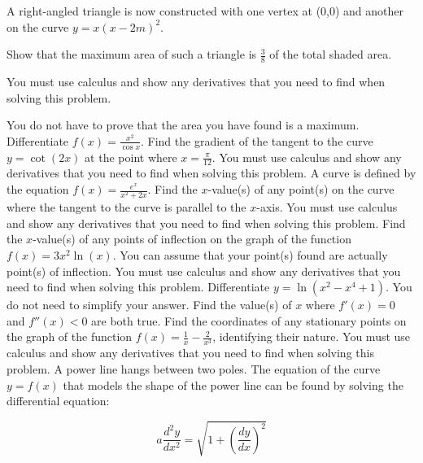\documentclass[12pt,addpoints]{exam}
\begin{document}
\begin{questions}
A right-angled triangle is now constructed with one vertex at (0,0) and another on the curve \( y = x(x - 2m)^2 \).

Show that the maximum area of such a triangle is \( \frac{3}{8} \) of the total shaded area.

You must use calculus and show any derivatives that you need to find when solving this problem.

You do not have to prove that the area you have found is a maximum.
\fillwithlines{3cm}
\question[5] Differentiate \( f(x) = \frac{x^2}{\cos x} \).
\fillwithlines{3cm}
\question[5] Find the gradient of the tangent to the curve \( y = \cot(2x) \) at the point where \( x = \frac{\pi}{12} \). You must use calculus and show any derivatives that you need to find when solving this problem.
\fillwithlines{3cm}
\question[5] A curve is defined by the equation \( f(x) = \frac{e^x}{x^2 + 2x} \). Find the \( x \)-value(s) of any point(s) on the curve where the tangent to the curve is parallel to the \( x \)-axis. You must use calculus and show any derivatives that you need to find when solving this problem.
\fillwithlines{3cm}
\question[5] Find the \( x \)-value(s) of any points of inflection on the graph of the function \( f(x) = 3x^2 \ln(x) \). You can assume that your point(s) found are actually point(s) of inflection. You must use calculus and show any derivatives that you need to find when solving this problem.
\fillwithlines{3cm}
\question[5] Differentiate \( y = \ln(x^2 - x^4 + 1) \). You do not need to simplify your answer.
\fillwithlines{3cm}
\question[5] Find the value(s) of \( x \) where \( f'(x) = 0 \) and \( f''(x) < 0 \) are both true.
\fillwithlines{3cm}
\question[5] Find the coordinates of any stationary points on the graph of the function \( f(x) = \frac{1}{x} - \frac{2}{x^3} \), identifying their nature. You must use calculus and show any derivatives that you need to find when solving this problem.
\fillwithlines{3cm}
\question[5] A power line hangs between two poles. The equation of the curve \( y = f(x) \) that models the shape of the power line can be found by solving the differential equation:

\[ a \frac{d^2 y}{dx^2} = \sqrt{1 + \left( \frac{dy}{dx} \right)^2} \]


\end{questions}
\end{document}
